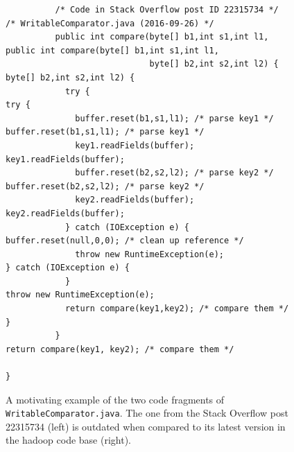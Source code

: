 \documentclass[sigconf,review, anonymous]{acmart}
\begin{document}
\begin{figure}
	\begin{lstlisting}
          /* Code in Stack Overflow post ID 22315734 */                  /* WritableComparator.java (2016-09-26) */
          public int compare(byte[] b1,int s1,int l1,                    public int compare(byte[] b1,int s1,int l1,
                             byte[] b2,int s2,int l2) {                                     byte[] b2,int s2,int l2) {
            try {                                                          try {
              buffer.reset(b1,s1,l1); /* parse key1 */                       buffer.reset(b1,s1,l1); /* parse key1 */
              key1.readFields(buffer);                                       key1.readFields(buffer);
              buffer.reset(b2,s2,l2); /* parse key2 */                       buffer.reset(b2,s2,l2); /* parse key2 */
              key2.readFields(buffer);                                       key2.readFields(buffer);
            } catch (IOException e) {                                        buffer.reset(null,0,0); /* clean up reference */
              throw new RuntimeException(e);                               } catch (IOException e) {
            }                                                                throw new RuntimeException(e);
            return compare(key1,key2); /* compare them */                  }
          }                                                                return compare(key1, key2); /* compare them */
	                                                                       }
	\end{lstlisting}\vspace{-2ex}
	\caption{A motivating example of the two code fragments of
          {\small\texttt{WritableComparator.java}}. The one from the
          Stack Overflow post 22315734 (left) is outdated when compared to
          its latest version in the \textsf{hadoop} code base
          (right).}
	\label{fig:before-after}
\end{figure}
\end{document}
